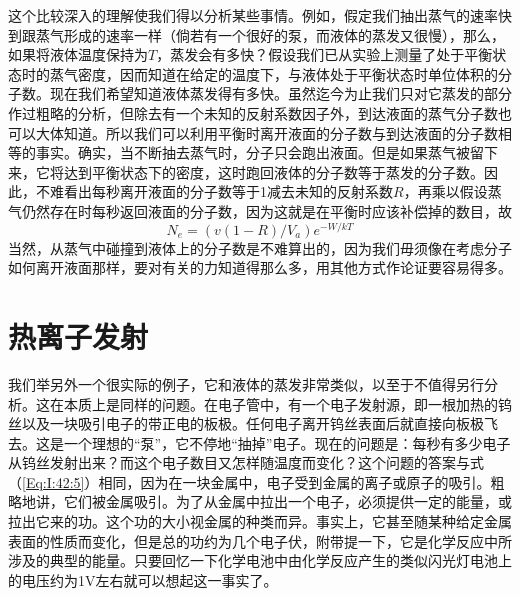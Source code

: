 这个比较深入的理解使我们得以分析某些事情。例如，假定我们抽出蒸气的速率快到跟蒸气形成的速率一样（倘若有一个很好的泵，而液体的蒸发又很慢），那么，如果将液体温度保持为$T$，蒸发会有多快？假设我们已从实验上测量了处于平衡状态时的蒸气密度，因而知道在给定的温度下，与液体处于平衡状态时单位体积的分子数。现在我们希望知道液体蒸发得有多快。虽然迄今为止我们只对它蒸发的部分作过粗略的分析，但除去有一个未知的反射系数因子外，到达液面的蒸气分子数也可以大体知道。所以我们可以利用平衡时离开液面的分子数与到达液面的分子数相等的事实。确实，当不断抽去蒸气时，分子只会跑出液面。但是如果蒸气被留下来，它将达到平衡状态下的密度，这时跑回液体的分子数等于蒸发的分子数。因此，不难看出每秒离开液面的分子数等于1减去未知的反射系数$R$，再乘以假设蒸气仍然存在时每秒返回液面的分子数，因为这就是在平衡时应该补偿掉的数目，故
\begin{equation}
    \label{Eq:I:42:5}
    N_e=(v(1-R)/V_a)e^{-W/kT}
\end{equation}
当然，从蒸气中碰撞到液体上的分子数是不难算出的，因为我们毋须像在考虑分子如何离开液面那样，要对有关的力知道得那么多，用其他方式作论证要容易得多。

\section{热离子发射}

我们举另外一个很实际的例子，它和液体的蒸发非常类似，以至于不值得另行分析。这在本质上是同样的问题。在电子管中，有一个电子发射源，即一根加热的钨丝以及一块吸引电子的带正电的板极。任何电子离开钨丝表面后就直接向板极飞去。这是一个理想的“泵”，它不停地“抽掉”电子。现在的问题是：每秒有多少电子从钨丝发射出来？而这个电子数目又怎样随温度而变化？这个问题的答案与式（\ref{Eq:I:42:5}）相同，因为在一块金属中，电子受到金属的离子或原子的吸引。粗略地讲，它们被金属吸引。为了从金属中拉出一个电子，必须提供一定的能量，或拉出它来的功。这个功的大小视金属的种类而异。事实上，它甚至随某种给定金属表面的性质而变化，但是总的功约为几个电子伏，附带提一下，它是化学反应中所涉及的典型的能量。只要回忆一下化学电池中由化学反应产生的类似闪光灯电池上的电压约为1V左右就可以想起这一事实了。


